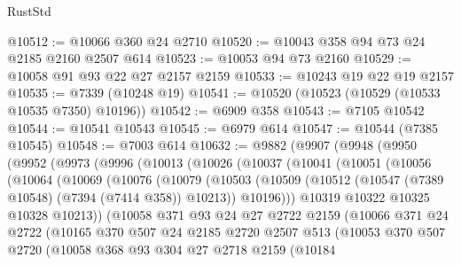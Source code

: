 \begin{lexlean}{RustStd}
\begin{coremodule}
@10512 := @10066 @360 @24 @2710
@10520 := @10043 @358 @94 @73 @24 @2185 @2160 @2507 @614
@10523 := @10053 @94 @73 @2160
@10529 := @10058 @91 @93 @22 @27 @2157 @2159
@10533 := @10243 @19 @22 @19 @2157
@10535 := @7339 (@10248 @19)
@10541 := @10520 (@10523 (@10529 (@10533 @10535 @7350) @10196))
@10542 := @6909 @358
@10543 := @7105 @10542
@10544 := @10541 @10543
@10545 := @6979 @614
@10547 := @10544 (@7385 @10545)
@10548 := @7003 @614
@10632 := @9882
    (@9907
      (@9948
        (@9950
          (@9952
            (@9973
              (@9996
                (@10013
                  (@10026
                    (@10037
                      (@10041
                        (@10051
                          (@10056
                            (@10064
                              (@10069
                                (@10076
                                  (@10079
                                    (@10503
                                      (@10509
                                        (@10512 (@10547 (@7389 @10548) (@7394 (@7414 @358)) @10213))
                                        @10196)))
                                  @10319
                                  @10322
                                  @10325
                                  @10328
                                  @10213))
                              (@10058
                                @371
                                @93
                                @24
                                @27
                                @2722
                                @2159
                                (@10066
                                  @371
                                  @24
                                  @2722
                                  (@10165
                                    @370
                                    @507
                                    @24
                                    @2185
                                    @2720
                                    @2507
                                    @513
                                    (@10053
                                      @370
                                      @507
                                      @2720
                                      (@10058
                                        @368
                                        @93
                                        @304
                                        @27
                                        @2718
                                        @2159
                                        (@10184

\end{coremodule}
\end{lexlean}
